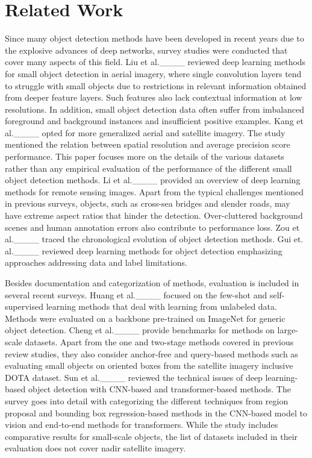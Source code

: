 \section{Related Work
\label{sec:RelatedWork}
}


Since many object detection methods have been developed in recent years due to the explosive advances of deep networks, survey studies were conducted that cover many aspects of this field. Liu et al.____ reviewed deep learning methods for small object detection in aerial imagery, where single convolution layers tend to struggle with small objects due to restrictions in relevant information obtained from deeper feature layers. Such features also lack contextual information at low resolutions. In addition, small object detection data often suffer from imbalanced foreground and background instances and insufficient positive examples. 
Kang et al.____ opted for more generalized aerial and satellite imagery. The study mentioned the relation between spatial resolution and average precision score performance.
This paper focuses more on the details of the various datasets rather than any empirical evaluation of the performance of the different small object detection methods.
Li et al.____ provided an overview of deep learning methods for remote sensing images. Apart from the typical challenges mentioned in previous surveys, objects, such as cross-sea bridges and slender roads, may have extreme aspect ratios that hinder the detection. Over-cluttered background scenes and human annotation errors also contribute to performance loss.
Zou et al.____ traced the chronological evolution of object detection methods. %
Gui et. al.____ reviewed deep learning methods for object detection emphasizing approaches addressing data and label limitations.

Besides documentation and categorization of methods, evaluation is included in several recent surveys. Huang et al.____ focused on the few-shot and self-supervised learning methods that deal with learning from unlabeled data. Methods were evaluated on a backbone pre-trained on ImageNet for generic object detection.
Cheng et al.____ provide benchmarks for methods on large-scale datasets. Apart from the one and two-stage methods covered in previous review studies, they also consider anchor-free and query-based methods such as evaluating small objects on oriented boxes from the satellite imagery inclusive DOTA dataset. 
Sun et al.____ reviewed the technical issues of deep learning-based object detection with CNN-based and transformer-based methods. The survey goes into detail with categorizing the different techniques from region proposal and bounding box regression-based methods in the CNN-based model to vision and end-to-end methods for transformers.
While the study includes comparative results for small-scale objects, the list of datasets included in their evaluation does not cover nadir satellite imagery.

